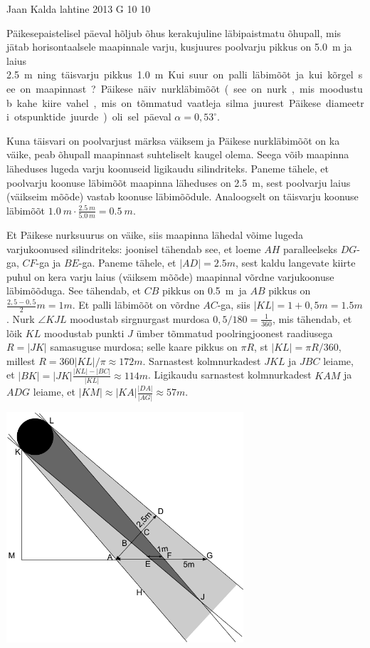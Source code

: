 {Jaan Kalda} %
{lahtine} %
{2013} %
{G 10} %
{10} %
{
\ifStatement
Päikesepaistelisel päeval hõljub õhus kerakujuline läbipaistmatu õhupall, mis
jätab horisontaalsele maapinnale varju, kusjuures poolvarju pikkus on \SI{5,0}{m}
ja laius \SI{2,5}m ning täisvarju pikkus \SI{1,0}{m}. Kui suur on palli
läbimõõt ja kui kõrgel see on maapinnast? Päikese näiv nurkläbimõõt  (see on nurk, 
mis moodustub kahe kiire vahel, mis on tõmmatud vaatleja silma juurest 
Päikese diameetri otspunktide juurde) oli sel
päeval $\alpha =0,53^\circ$.
\fi


\ifHint
Kuna täisvari on poolvarjust märksa väiksem ja Päikese nurkläbimõõt on ka väike, peab õhupall maapinnast suhteliselt kaugel olema. Seega võib maapinna läheduses lugeda varju koonuseid ligikaudu silindriteks. Paneme tähele, et poolvarju koonuse läbimõõt maapinna läheduses on \SI{2,5}{m}, sest poolvarju laius (väikseim mõõde) vastab koonuse läbimõõdule. Analoogselt on täisvarju koonuse läbimõõt $\SI{1,0}{m}\cdot\frac{\SI{2,5}{m}}{\SI{5,0}{m}} = \SI{0,5}{m}$.
\fi


\ifSolution
Et Päikese nurksuurus on väike, siis maapinna lähedal võime lugeda varjukoonused silindriteks: joonisel tähendab see, et loeme $AH$ paralleelseks $DG$-ga, $CF$-ga ja $BE$-ga.
Paneme tähele, et $|AD|=\SI{2,5}m$, sest kaldu langevate kiirte puhul on kera varju laius (väiksem mõõde) maapinnal võrdne varjukoonuse läbimõõduga.
See tähendab, et $CB$ pikkus on \SI{0,5}m ja $AB$ pikkus on $\frac{2,5-0,5}2\SI{}m=\SI{1}m$. Et palli läbimõõt on võrdne $AC$-ga, siis $|KL|=1+0,5\SI{}m=\SI{1,5}m$.
Nurk $\angle KJL$ moodustab sirgnurgast murdosa $0,5/180=\frac 1{360}$, mis tähendab, et lõik $KL$ moodustab punkti $J$ ümber tõmmatud poolringjoonest raadiusega $R=|JK|$
samasuguse murdosa; selle kaare pikkus on $\pi R$, st $|KL|=\pi R /360$, millest $R=360|KL|/\pi\approx \SI{172}m$. Sarnastest kolmnurkadest $JKL$ ja $JBC$ leiame, et $|BK|=|JK|\frac{|KL|-|BC|}{|KL|}\approx \SI{114}m$. Ligikaudu sarnastest kolmnurkadest $KAM$ ja $ADG$ leiame, et  $|KM|\approx |KA|\frac{|DA|}{|AG|}\approx \SI{57}m$.

\begin{center}
\includegraphics[width=250pt]{2013-lahg-10-pxike-pall-vari}%
\end{center}
\fi


}
